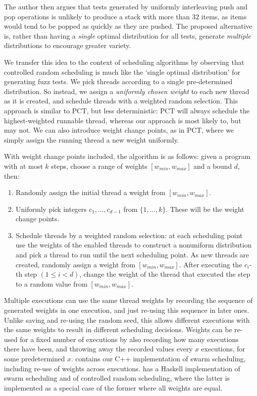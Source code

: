 The author then argues that tests generated by uniformly interleaving push and
pop operations is unlikely to produce a stack with more than 32 items, as items
would tend to be popped as quickly as they are pushed.  The proposed alternative
is, rather than having a \emph{single} optimal distribution for all tests,
generate \emph{multiple} distributions to encourage greater variety.

We transfer this idea to the context of scheduling algorithms by
observing that controlled random scheduling is much like the `single
optimal distribution' for generating fuzz tests.  We pick threads
according to a single pre-determined distribution.  So instead, we
assign a \emph{uniformly chosen weight} to each new thread as it is
created, and schedule threads with a weighted random selection.  This
approach is similar to PCT, but less deterministic: PCT will always
schedule the highest-weighted runnable thread, whereas our approach is
most likely to, but may not.  We can also introduce weight change
points, as in PCT, where we simply assign the running thread a new
weight uniformly.

With weight change points included, the algorithm is as follows: given a program
with at most $k$ steps, choose a range of weights $[w_{min}, w_{max}]$ and
a bound $d$, then:

\begin{enumerate}
\item Randomly assign the initial thread a weight from $[w_{min}, w_{max}]$.
\item Uniformly pick integers $c_1, \ldots, c_{d-1}$ from $\{1, \ldots, k\}$.
These will be the weight change points.
\item Schedule threads by a weighted random selection: at each scheduling point
use the weights of the enabled threads to construct a nonuniform distribution
and pick a thread to run until the next scheduling point.  As new threads are
created, randomly assign a weight from $[w_{min}, w_{max}]$.  After executing
the $c_i$-th step $(1 \leq i < d)$, change the weight of the thread that
executed the step to a random value from $[w_{min}, w_{max}]$.
\end{enumerate}

Multiple executions can use the same thread weights by recording the sequence of
generated weights in one execution, and just re-using this sequence in later
ones.  Unlike saving and re-using the random seed, this allows different
executions with the same weights to result in different scheduling decisions.
Weights can be re-used for a fixed number of executions by also recording how
many executions there have been, and throwing away the recorded values every $x$
executions, for some predetermined $x$.   contains our C++
implementation of swarm scheduling, including re-use of weights across
executions.  \dejafu{} has a Haskell implementation of swarm scheduling and of
controlled random scheduling, where the latter is implemented as a special case
of the former where all weights are equal.

